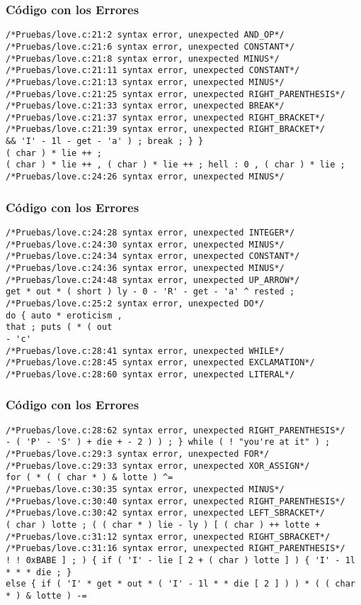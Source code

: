 \documentclass{beamer}
\begin{document}
\begin{frame}[fragile]
\frametitle{C\'odigo con los Errores}
\begin{verbatim}
/*Pruebas/love.c:21:2 syntax error, unexpected AND_OP*/
/*Pruebas/love.c:21:6 syntax error, unexpected CONSTANT*/
/*Pruebas/love.c:21:8 syntax error, unexpected MINUS*/
/*Pruebas/love.c:21:11 syntax error, unexpected CONSTANT*/
/*Pruebas/love.c:21:13 syntax error, unexpected MINUS*/
/*Pruebas/love.c:21:25 syntax error, unexpected RIGHT_PARENTHESIS*/
/*Pruebas/love.c:21:33 syntax error, unexpected BREAK*/
/*Pruebas/love.c:21:37 syntax error, unexpected RIGHT_BRACKET*/
/*Pruebas/love.c:21:39 syntax error, unexpected RIGHT_BRACKET*/
&& 'I' - 1l - get - 'a' ) ; break ; } } 
( char ) * lie ++ ; 
( char ) * lie ++ , ( char ) * lie ++ ; hell : 0 , ( char ) * lie ; 
/*Pruebas/love.c:24:26 syntax error, unexpected MINUS*/
\end{verbatim}
\end{frame}
\begin{frame}[fragile]
\frametitle{C\'odigo con los Errores}
\begin{verbatim}
/*Pruebas/love.c:24:28 syntax error, unexpected INTEGER*/
/*Pruebas/love.c:24:30 syntax error, unexpected MINUS*/
/*Pruebas/love.c:24:34 syntax error, unexpected CONSTANT*/
/*Pruebas/love.c:24:36 syntax error, unexpected MINUS*/
/*Pruebas/love.c:24:48 syntax error, unexpected UP_ARROW*/
get * out * ( short ) ly - 0 - 'R' - get - 'a' ^ rested ; 
/*Pruebas/love.c:25:2 syntax error, unexpected DO*/
do { auto * eroticism , 
that ; puts ( * ( out 
- 'c' 
/*Pruebas/love.c:28:41 syntax error, unexpected WHILE*/
/*Pruebas/love.c:28:45 syntax error, unexpected EXCLAMATION*/
/*Pruebas/love.c:28:60 syntax error, unexpected LITERAL*/
\end{verbatim}
\end{frame}
\begin{frame}[fragile]
\frametitle{C\'odigo con los Errores}
\begin{verbatim}
/*Pruebas/love.c:28:62 syntax error, unexpected RIGHT_PARENTHESIS*/
- ( 'P' - 'S' ) + die + - 2 ) ) ; } while ( ! "you're at it" ) ; 
/*Pruebas/love.c:29:3 syntax error, unexpected FOR*/
/*Pruebas/love.c:29:33 syntax error, unexpected XOR_ASSIGN*/
for ( * ( ( char * ) & lotte ) ^= 
/*Pruebas/love.c:30:35 syntax error, unexpected MINUS*/
/*Pruebas/love.c:30:40 syntax error, unexpected RIGHT_PARENTHESIS*/
/*Pruebas/love.c:30:42 syntax error, unexpected LEFT_SBRACKET*/
( char ) lotte ; ( ( char * ) lie - ly ) [ ( char ) ++ lotte + 
/*Pruebas/love.c:31:12 syntax error, unexpected RIGHT_SBRACKET*/
/*Pruebas/love.c:31:16 syntax error, unexpected RIGHT_PARENTHESIS*/
! ! 0xBABE ] ; ) { if ( 'I' - lie [ 2 + ( char ) lotte ] ) { 'I' - 1l * * * die ; } 
else { if ( 'I' * get * out * ( 'I' - 1l * * die [ 2 ] ) ) * ( ( char * ) & lotte ) -= 
\end{verbatim}
\end{frame}
\end{document}

